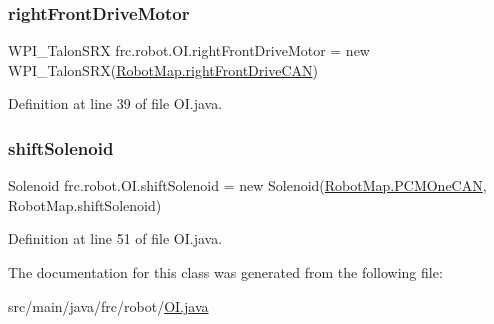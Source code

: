 \subsubsection{\texorpdfstring{right\+Front\+Drive\+Motor}{rightFrontDriveMotor}}
{\footnotesize\ttfamily W\+P\+I\+\_\+\+Talon\+S\+RX frc.\+robot.\+O\+I.\+right\+Front\+Drive\+Motor = new W\+P\+I\+\_\+\+Talon\+S\+RX(\hyperlink{classfrc_1_1robot_1_1_robot_map_a4ca461a7ad91df180971974fd6abc236}{Robot\+Map.\+right\+Front\+Drive\+C\+AN})\hspace{0.3cm}{\ttfamily [static]}}



Definition at line 39 of file O\+I.\+java.

\mbox{\label{classfrc_1_1robot_1_1_o_i_a63a56e8585378f6afe6f45facc98f494}} 
\subsubsection{\texorpdfstring{shift\+Solenoid}{shiftSolenoid}}
{\footnotesize\ttfamily Solenoid frc.\+robot.\+O\+I.\+shift\+Solenoid = new Solenoid(\hyperlink{classfrc_1_1robot_1_1_robot_map_a79a848df56d706c787d9a4f9a0434e7f}{Robot\+Map.\+P\+C\+M\+One\+C\+AN}, Robot\+Map.\+shift\+Solenoid)\hspace{0.3cm}{\ttfamily [static]}}



Definition at line 51 of file O\+I.\+java.



The documentation for this class was generated from the following file\+:\begin{DoxyCompactItemize}
\item 
src/main/java/frc/robot/\hyperlink{_o_i_8java}{O\+I.\+java}\end{DoxyCompactItemize}
